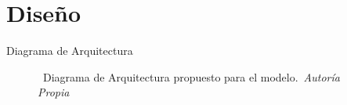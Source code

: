 \section{Diseño}

\begin{frame}{Diagrama de Arquitectura}%
    \vspace{-0.15cm}
    \begin{figure}[H]
        \centering
        \href{run:C:/Users/emicr/Documents/ESCOLARES/ESCOM/TRABAJO TERMINAL/Presentacion/img/Design/Arquitectura.drawio}{%
        }
        \vspace{-0.25cm}
        \caption{\tiny~Diagrama de Arquitectura propuesto para el modelo.~\textit{Autoría Propia}}%
        \label{fig:architecture_diagram}
    \end{figure}
\end{frame}